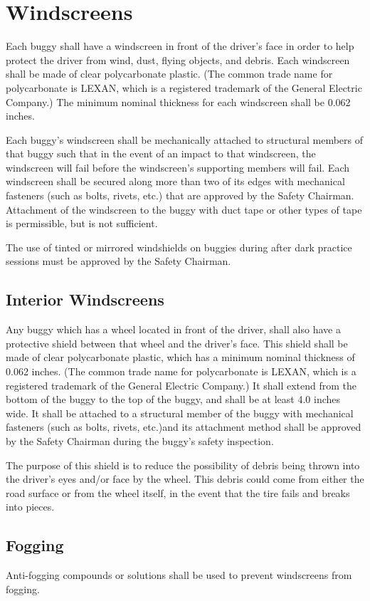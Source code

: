 \section{Windscreens}

	Each buggy shall have a windscreen in front of the driver's face in order to
	help protect the driver from wind, dust, flying objects, and debris. Each
	windscreen shall be made of clear polycarbonate plastic. (The common trade name
	for polycarbonate is LEXAN, which is a registered trademark of the General
	Electric Company.) The minimum nominal thickness for each windscreen shall be
	0.062 inches.

	Each buggy's windscreen shall be mechanically attached to structural members of
	that buggy such that in the event of an impact to that windscreen, the
	windscreen will fail before the windscreen's supporting members will fail. Each
	windscreen shall be secured along more than two of its edges with mechanical
	fasteners (such as bolts, rivets, etc.) that are approved by the Safety
	Chairman. Attachment of the windscreen to the buggy with duct tape or other
	types of tape is permissible, but is not sufficient.

	The use of tinted or mirrored windshields on buggies during after dark practice
	sessions must be approved by the Safety Chairman.

\subsection{Interior Windscreens}

	Any buggy which has a wheel located in front of the driver, shall also have a
	protective shield between that wheel and the driver's face. This shield shall
	be made of clear polycarbonate plastic, which has a minimum nominal thickness
	of 0.062 inches. (The common trade name for polycarbonate is LEXAN, which is a
	registered trademark of the General Electric Company.) It shall extend from the
	bottom of the buggy to the top of the buggy, and shall be at least 4.0 inches
	wide. It shall be attached to a structural member of the buggy with mechanical
	fasteners (such as bolts, rivets, etc.)and its attachment method shall be
	approved by the Safety Chairman during the buggy's safety inspection.

	The purpose of this shield is to reduce the possibility of debris being thrown
	into the driver's eyes and/or face by the wheel. This debris could come from
	either the road surface or from the wheel itself, in the event that the tire
	fails and breaks into pieces.

\subsection{Fogging}

	Anti-fogging compounds or solutions shall be used to prevent windscreens
	from fogging.


